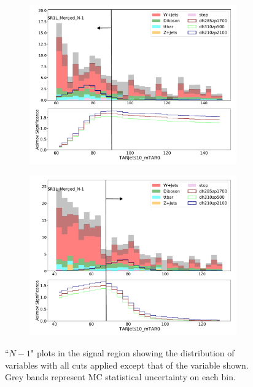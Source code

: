 \begin{figure}[htbp]
\begin{subfigure}{0.49\textwidth}
     \includegraphics[width = 0.98\textwidth]{Figures/4/N1m/TARJets10_mTAR0.pdf}
     \caption{\mTAR}
     \end{subfigure}
     \begin{subfigure}{0.49\textwidth}
     \includegraphics[width = 0.98\textwidth]{Figures/4/N1m/TARJets10_mTAR02.pdf}
     \caption{\mTAR}
     \end{subfigure}

     \caption{``$N-1$" plots in the \merged signal region showing the distribution of variables with all cuts applied except that of the variable shown. Grey bands represent MC statistical uncertainty on each bin.}
     \label{fig:SRN1}
  \end{figure}
\FloatBarrier


